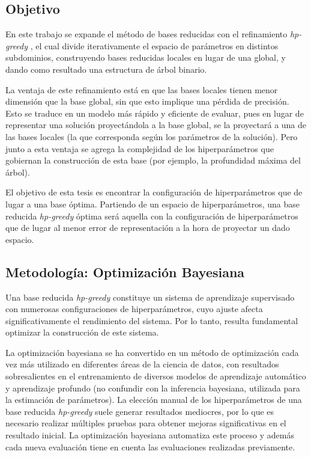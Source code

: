 \subsection*{Objetivo}

En este trabajo se expande el método de bases reducidas con el refinamiento \textit{hp-greedy} \cite{Cerino:2022dhr}, el cual divide iterativamente el espacio de parámetros en distintos subdominios, construyendo bases reducidas locales en lugar de una global, y dando como resultado una estructura de árbol binario.

La ventaja de este refinamiento está en que las bases locales tienen menor dimensión que la base global, sin que esto implique una pérdida de precisión. Esto se traduce en un modelo más rápido y eficiente de evaluar, pues en lugar de representar una solución proyectándola a la base global, se la proyectará a una de las bases locales (la que corresponda según los parámetros de la solución). 
Pero junto a esta ventaja se agrega la complejidad de los hiperparámetros que gobiernan la construcción de esta base (por ejemplo, la profundidad máxima del árbol).


El objetivo de esta tesis es encontrar la configuración de hiperparámetros que de lugar a una base óptima. Partiendo de un espacio de hiperparámetros, una base reducida \textit{hp-greedy} óptima será aquella con la configuración de hiperparámetros que de lugar al menor error de representación a la hora de proyectar un dado espacio. 


\subsection*{Metodología: Optimización Bayesiana}

Una base reducida \textit{hp-greedy} constituye un sistema de aprendizaje supervisado con numerosas configuraciones de hiperparámetros, cuyo ajuste afecta significativamente el rendimiento del sistema. Por lo tanto, resulta fundamental optimizar la construcción de este sistema.

La optimización bayesiana \cite{7352306, https://doi.org/10.48550/arxiv.1012.2599} se ha convertido en un método de optimización cada vez más utilizado en diferentes áreas de la ciencia de datos, con resultados sobresalientes en el entrenamiento de diversos modelos de aprendizaje automático y aprendizaje profundo (no confundir con la inferencia bayesiana, utilizada para la estimación de parámetros). La elección manual de los hiperparámetros de una base reducida \textit{hp-greedy} suele generar resultados mediocres, por lo que es necesario realizar múltiples pruebas para obtener mejoras significativas en el resultado inicial. La optimización bayesiana automatiza este proceso y además cada nueva evaluación tiene en cuenta las evaluaciones realizadas previamente. 

